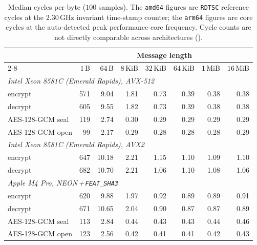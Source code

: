 \begin{table}
\centering
\caption{Median cycles per byte ($100$ samples). The \texttt{amd64} figures are
\texttt{RDTSC} reference cycles at the $2.30$\,GHz invariant time-stamp counter;
the \texttt{arm64} figures are core cycles at the auto-detected peak performance-core
frequency. Cycle counts are not directly comparable across architectures
().}
\label{tab:cpb}
\begin{tabular}{l rrrrrrr}
\toprule
& \multicolumn{7}{c}{Message length} \\
\cmidrule(l){2-8}
& $1$\,B & $64$\,B & $8$\,KiB & $32$\,KiB & $64$\,KiB & $1$\,MiB & $16$\,MiB \\
\midrule
\multicolumn{8}{l}{\emph{Intel Xeon 8581C (Emerald Rapids), AVX-512}} \\
\quad \TW{} encrypt      & 571 & 9.04 & 1.81 & 0.73 & 0.39 & 0.38 & 0.38 \\
\quad \TW{} decrypt      & 605 & 9.55 & 1.82 & 0.73 & 0.39 & 0.38 & 0.38 \\
\quad AES-128-GCM seal   & 119 & 2.74 & 0.30 & 0.29 & 0.29 & 0.29 & 0.29 \\
\quad AES-128-GCM open   & 99 & 2.17 & 0.29 & 0.28 & 0.28 & 0.28 & 0.29 \\
\midrule
\multicolumn{8}{l}{\emph{Intel Xeon 8581C (Emerald Rapids), AVX2}} \\
\quad \TW{} encrypt      & 647 & 10.18 & 2.21 & 1.15 & 1.10 & 1.09 & 1.10 \\
\quad \TW{} decrypt      & 682 & 10.70 & 2.21 & 1.06 & 1.10 & 1.08 & 1.06 \\
\midrule
\multicolumn{8}{l}{\emph{Apple M4 Pro, NEON\,+\,\texttt{FEAT\_SHA3}}} \\
\quad \TW{} encrypt      & 620 & 9.88 & 1.97 & 0.92 & 0.89 & 0.89 & 0.91 \\
\quad \TW{} decrypt      & 671 & 10.65 & 2.04 & 0.90 & 0.87 & 0.87 & 0.89 \\
\quad AES-128-GCM seal   & 113 & 2.84 & 0.44 & 0.43 & 0.43 & 0.44 & 0.46 \\
\quad AES-128-GCM open   & 123 & 2.56 & 0.42 & 0.41 & 0.41 & 0.42 & 0.43 \\
\bottomrule
\end{tabular}
\end{table}

